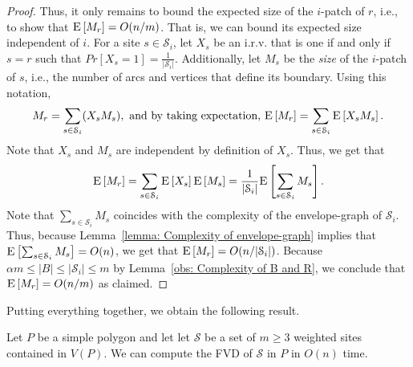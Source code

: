 \documentclass[a4paper,UKenglish]{socg-lipics-v2018}
\newcommand{\icell}[1][i]{${#1}$-patch\xspace}
\newcommand{\s}{\mathcal S}
\newcommand{\ex}[1]{\textsc{E}\left[#1\right]}
\begin{document}
\begin{proof}
Thus, it only remains to bound the expected size of the \icell of $r$, i.e., to show that $\ex{M_r} = O(n/m)$.
That is, we can bound its expected size independent of $i$.
For a site $s\in \s_i$, let $X_s$ be an i.r.v. that is one if and only if $s = r$ such that $Pr[X_s = 1] = \frac{1}{|\s_i|}$.
Additionally, let $M_s$ be the \emph{size} of the \icell of $s$, i.e., the number of arcs and vertices that define its boundary. 
Using this notation,
\[M_r = \sum_{s\in \s_i} ( X_s M_s), \text{ and by taking expectation, } \ex{M_r} = \sum_{s\in \s_i} \ex{X_s M_s}.\]
Note that $X_s$ and $M_s$ are independent by definition of $X_s$.
Thus, we get that  
\[\ex{M_r} = \sum_{s\in \s_i} \ex{X_s} \ex{M_s} = \frac{1}{|\s_i|} \ex{\sum_{s\in \s_i} M_s}.\]
Note that $\sum_{s\in \s_i} M_s$ coincides with the complexity of the envelope-graph of $\s_i$.
Thus, because Lemma~\ref{lemma: Complexity of envelope-graph} implies that $\ex{\sum_{s\in \s_i} M_s} = O(n)$, we get that  $\ex{M_r} = O(n/|\s_i|)$.
Because $\alpha m \leq |B| \leq |\s_i| \leq m$ by Lemma~\ref{obs: Complexity of B and R}, we conclude that $\ex{M_r} = O(n/m)$ as claimed.
\end{proof}

Putting everything together, we obtain the following result.

\begin{theorem}
Let  $P$ be a simple polygon and let let $\s$ be a set of $m\geq 3$ weighted sites contained in $V(P)$.
We can compute the FVD of $\s$ in $P$ in $O(n)$ time. 
\end{theorem}


\newpage
{\small

}

\end{document}
